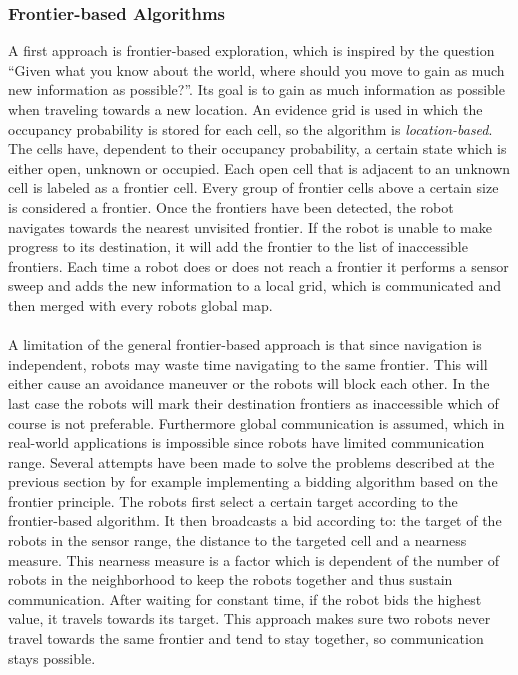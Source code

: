 	\subsubsection{Frontier-based Algorithms}
	A first approach is frontier-based exploration, which is inspired by the question ``Given what you know about the world, where should you move to gain as much new information as possible?''.
	Its goal is to gain as much information as possible when traveling towards a new location.
	An evidence grid is used in which the occupancy probability is stored for each cell, so the algorithm is \emph{location-based}.
	The cells have, dependent to their occupancy probability, a certain state which is either open, unknown or occupied.
	Each open cell that is adjacent to an unknown cell is labeled as a frontier cell.
	Every group of frontier cells above a certain size is considered a frontier.
	Once the frontiers have been detected, the robot navigates towards the nearest unvisited frontier.
	If the robot is unable to make progress to its destination, it will add the frontier to the list of inaccessible frontiers.
	Each time a robot does or does not reach a frontier it performs a sensor sweep and adds the new information to a local grid, which is communicated and then merged with every robots global map. \cite{yamauchi1998frontier}\\
	\\
	A limitation of the general frontier-based approach is that since navigation is independent, robots may waste time navigating to the same frontier.
	This will either cause an avoidance maneuver or the robots will block each other.
	In the last case the robots will mark their destination frontiers as inaccessible which of course is not preferable.
	Furthermore global communication is assumed, which in real-world applications is  impossible since robots have limited communication range. 
	Several attempts have been made to solve the problems described at the previous section by for example implementing a bidding algorithm based on the frontier principle.
	The robots first select a certain target according to the frontier-based algorithm.
	It then broadcasts a bid according to: the target of the robots in the sensor range, the distance to the targeted cell and a nearness measure.
	This nearness measure is a factor which is dependent of the number of robots in the neighborhood to keep the robots together and thus sustain communication.
	After waiting for constant time, if the robot bids the highest value, it travels towards its target.
	This approach makes sure two robots never travel towards the same frontier and tend to stay together, so communication stays possible.
